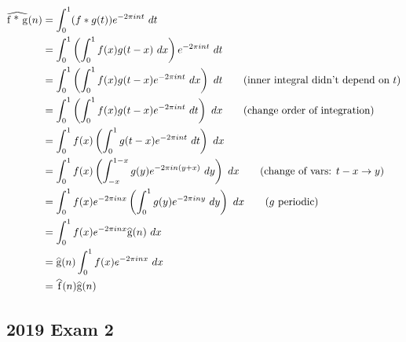 \documentclass[11pt]{article}
\numberwithin{equation}{section}
\theoremstyle{definition}
\theoremstyle{definition}
\newcommand\parens[1]{\left( #1 \right)}
\newcommand\widehatt[1]{%
\savestack{\tmpbox}{\stretchto{%
  \scaleto{%
    \scalerel*[\widthof{\ensuremath{#1}}]{\kern-.6pt\bigwedge\kern-.6pt}%
    {\rule[-\textheight/2]{1ex}{\textheight}}%
  }{\textheight}%
}{0.5ex}}%
\stackon[1pt]{#1}{\tmpbox}%
}
\newcommand{\1}{\mathbbm 1}
\begin{document}
\begin{align*}
	\widehatt{f * g}(n) &= \int_0^1 (f * g(t)) e^{-2\pi i n t}\ dt \\
	&= \int_0^1 \parens{\int_0^1 f(x)g(t-x) \ dx} e^{-2\pi i n t} \ dt \\
	&= \int_0^1 \parens{\int_0^1 f(x)g(t-x)  e^{-2\pi i n t} \ dx} \ dt \tag{inner integral didn't depend on $t$} \\
	&= \int_0^1 \parens{\int_0^1 f(x)g(t-x)  e^{-2\pi i n t} \ dt} \ dx \tag{change order of integration} \\
	&= \int_0^1 f(x) \parens{\int_0^1 g(t-x)  e^{-2\pi i n t} \ dt} \ dx \\
	&=  \int_0^1 f(x) \parens{\int_{-x}^{1-x} g(y)  e^{-2\pi i n (y + x)} \ dy} \ dx \tag{change of vars: $t-x \to y$} \\
	&= \int_0^1 f(x) e^{-2\pi i n x} \parens{\int_{0}^{1} g(y)  e^{-2\pi i n y} \ dy} \ dx \tag{$g$ periodic} \\
	&= \int_0^1 f(x) e^{-2\pi i n x} \widehatt{g}(n) \ dx \\
	&= \widehatt{g}(n) \int_0^1 f(x) e^{-2\pi i n x} \ dx \\
	&= \widehatt{f}(n) \widehatt{g}(n)
\end{align*}


\subsection{2019 Exam 2}
\end{document}

